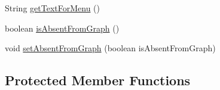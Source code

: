 \begin{DoxyCompactItemize}
\item 
String \hyperlink{classorg_1_1tzi_1_1use_1_1gui_1_1views_1_1diagrams_1_1elements_1_1_placeable_node_a4d290f8267b4554ec268ad9dcb088db1}{get\-Text\-For\-Menu} ()
\item 
boolean \hyperlink{classorg_1_1tzi_1_1use_1_1gui_1_1views_1_1diagrams_1_1elements_1_1_placeable_node_a071971ed291d98c06eb795b683c79b76}{is\-Absent\-From\-Graph} ()
\item 
void \hyperlink{classorg_1_1tzi_1_1use_1_1gui_1_1views_1_1diagrams_1_1elements_1_1_placeable_node_ae68854b882a886458fe611ae94620dd0}{set\-Absent\-From\-Graph} (boolean is\-Absent\-From\-Graph)
\end{DoxyCompactItemize}
\subsection*{Protected Member Functions}
